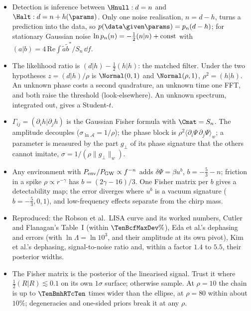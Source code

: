 \begin{recap}
\begin{itemize}[itemsep=1pt,leftmargin=1.2em]
  \item Detection is inference between $\Hnull:d=n$ and $\Halt:d=n+h(\params)$. Only one noise realisation, $n=d-h$, turns a
        prediction into the data, so $p(\data\given\params)=p_n(d-h)$; for stationary Gaussian noise
        $\ln p_n(n)=-\tfrac12(n|n)+{\rm const}$ with $(a|b)=4\,\mathrm{Re}\int\tilde a\tilde b^*/S_n\,\dd f$.
  \item The likelihood ratio is $(d|h)-\tfrac12(h|h)$: the matched filter. Under the two hypotheses $z=(d|h)/\rho$ is
        $\Normal(0,1)$ and $\Normal(\rho,1)$, $\rho^2=(h|h)$. An unknown phase costs a second quadrature, an unknown time one
        FFT, and both raise the threshold (look-elsewhere). An unknown spectrum, integrated out, gives a Student-$t$.
  \item $\Gamma_{ij}=(\partial_ih|\partial_jh)$ is the Gaussian Fisher formula with $\Cmat=S_n$. The amplitude decouples
        ($\sigma_{\ln\mathcal A}=1/\rho$); the phase block is $\rho^2\langle\partial_i\Psi\,\partial_j\Psi\rangle_w$; a parameter is measured
        by the part $g_\perp$ of its phase signature that the others cannot imitate, $\sigma=1/(\rho\|g_\perp\|_w)$.
  \item Any environment with $P_{\rm env}/P_{\rm GW}\propto f^{-n}$ adds $\delta\Psi=\beta u^b$, $b=-\tfrac53-n$; friction in a spike
        $\rho\propto r^{-\gamma}$ has $b=(2\gamma-16)/3$. One Fisher matrix per $b$ gives a detectability map; the error diverges
        where $u^b$ is a vacuum signature ($b=-\tfrac53,0,1$), and low-frequency effects separate from the chirp mass.
  \item Reproduced: the Robson et al.\ LISA curve and its worked numbers, Cutler and Flanagan's Table~I (within
        $\TenBcfMaxDev\%$), Eda et al.'s dephasing and errors (with $\ln\Lambda=\ln10^3$, and their amplitude at its own pivot),
        Kim et al.'s dephasing, signal-to-noise ratio and, within a factor $1.4$ to $5.5$, their posterior widths.
  \item The Fisher matrix is the posterior of the linearised signal. Trust it where $\tfrac12(R|R)\lesssim0.1$ on its own
        $1\sigma$ surface; otherwise sample. At $\rho=10$ the chain is up to $\TenBmhRTcTen$ times wider than the ellipse,
        at $\rho=80$ within about $10\%$; degeneracies and one-sided priors break it at any $\rho$.
\end{itemize}
\end{recap}
